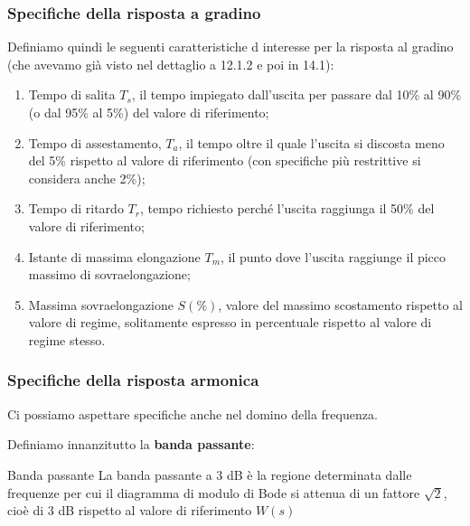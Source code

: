 \documentclass[a4paper,11pt]{article}
\begin{document}
\subsubsection{Specifiche della risposta a gradino}
Definiamo quindi le seguenti caratteristiche d interesse per la risposta al gradino (che avevamo già visto nel dettaglio a 12.1.2 e poi in 14.1):
\begin{enumerate}
	\item Tempo di salita $T_s$, il tempo impiegato dall'uscita per passare dal 10\% al 90\% (o dal 95\% al 5\%) del valore di riferimento;
	\item Tempo di assestamento, $T_a$, il tempo oltre il quale l'uscita si discosta meno del 5\% rispetto al valore di riferimento (con specifiche più restrittive si considera anche 2\%);
	\item Tempo di ritardo $T_r$, tempo richiesto perché l'uscita raggiunga il 50\% del valore di riferimento;
	\item Istante di massima elongazione $T_m$, il punto dove l'uscita raggiunge il picco massimo di sovraelongazione;
	\item Massima sovraelongazione $S(\%)$, valore del massimo scostamento rispetto al valore di regime, solitamente espresso in percentuale rispetto al valore di regime stesso.
\end{enumerate}

\subsubsection{Specifiche della risposta armonica}
Ci possiamo aspettare specifiche anche nel domino della frequenza.

Definiamo innanzitutto la \textbf{banda passante}:
\begin{definition}{Banda passante}
	La banda passante a 3 dB è la regione determinata dalle frequenze per cui il diagramma di modulo di Bode si attenua di un fattore $\sqrt{2}$, cioè di 3 dB rispetto al valore di riferimento $W(s)$ 
\end{definition}
\end{document}
